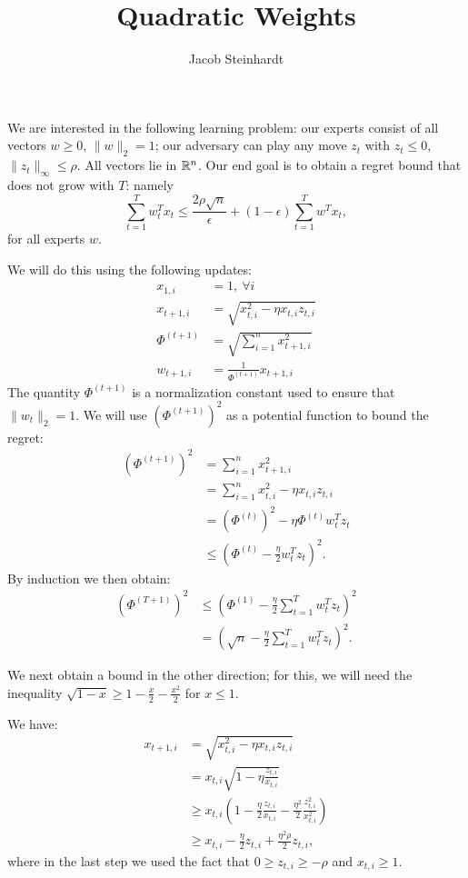 \documentclass[11pt]{article}
\title{Quadratic Weights}
\author{Jacob Steinhardt}
\begin{document}
\maketitle
We are interested in the following learning problem: our experts 
consist of all vectors $w \geq 0$, $\|w\|_2 = 1$; our adversary 
can play any move $z_t$ with $z_t \leq 0$, $\|z_t\|_{\infty} \leq \rho$. 
All vectors lie in $\mathbb{R}^n$.
Our end goal is to obtain a regret bound that does not grow with $T$:
namely
\[ \sum_{t=1}^T w_t^Tx_t \leq \frac{2\rho \sqrt{n}}{\epsilon} + (1-\epsilon)\sum_{t=1}^T w^Tx_t, \]
for all experts $w$.

We will do this using the following updates:
\begin{align*}
        x_{1, i} &= 1,\ \forall i \\
        x_{t+1, i} &= \sqrt{x_{t,i}^2 - \eta x_{t,i}z_{t,i}} \\
        \Phi^{(t+1)} &= \sqrt{\sum_{i=1}^n x_{t+1,i}^2} \\
        w_{t+1,i} &= \frac{1}{\Phi^{(t+1)}}x_{t+1,i}
\end{align*}
The quantity $\Phi^{(t+1)}$ is a normalization constant used to 
ensure that $\|w_t\|_2 = 1$. We will use $(\Phi^{(t+1)})^2$ as a 
potential function to bound the regret:
\begin{align*}
        (\Phi^{(t+1)})^2 &= \sum_{i=1}^n x_{t+1,i}^2 \\
                         &= \sum_{i=1}^n x_{t,i}^2 - \eta x_{t,i}z_{t,i} \\
                         &= (\Phi^{(t)})^2 - \eta \Phi^{(t)}w_t^Tz_t \\
                         &\leq (\Phi^{(t)}-\frac{\eta}{2}w_t^Tz_t)^2.
\end{align*}
By induction we then obtain:
\begin{align}
        (\Phi^{(T+1)})^2 &\leq (\Phi^{(1)}-\frac{\eta}{2}\sum_{t=1}^Tw_t^Tz_t)^2 \\
                         &= (\sqrt{n}-\frac{\eta}{2}\sum_{t=1}^Tw_t^Tz_t)^2.
\end{align}

We next obtain a bound in the other direction; for this, we will need the 
inequality $\sqrt{1-x} \geq 1-\frac{x}{2}-\frac{x^2}{2}$ for $x \leq 1$.

We have:
\begin{align*}
        x_{t+1,i} &= \sqrt{x_{t,i}^2 - \eta x_{t,i}z_{t,i}} \\
                  &= x_{t,i}\sqrt{1-\eta\frac{z_{t,i}}{x_{t,i}}} \\
                  &\geq x_{t,i}(1-\frac{\eta}{2}\frac{z_{t,i}}{x_{t,i}} - \frac{\eta^2}{2}\frac{z_{t,i}^2}{x_{t,i}^2}) \\
                  &\geq x_{t,i} - \frac{\eta}{2}z_{t,i} + \frac{\eta^2\rho}{2}z_{t,i},
\end{align*}
where in the last step we used the fact 
that $0 \geq z_{t,i} \geq -\rho$ and $x_{t,i} \geq 1$.
\end{document}
